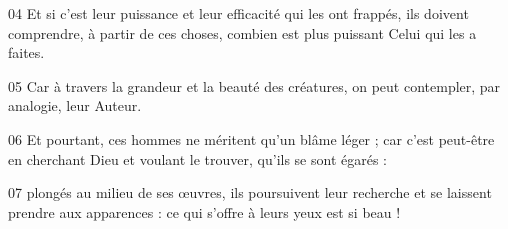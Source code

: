 
04 Et si c’est leur puissance et leur efficacité qui les ont frappés, ils doivent comprendre, à partir de ces choses, combien est plus puissant Celui qui les a faites.

05 Car à travers la grandeur et la beauté des créatures, on peut contempler, par analogie, leur Auteur.

06 Et pourtant, ces hommes ne méritent qu’un blâme léger ; car c’est peut-être en cherchant Dieu et voulant le trouver, qu’ils se sont égarés :

07 plongés au milieu de ses œuvres, ils poursuivent leur recherche et se laissent prendre aux apparences : ce qui s’offre à leurs yeux est si beau !
